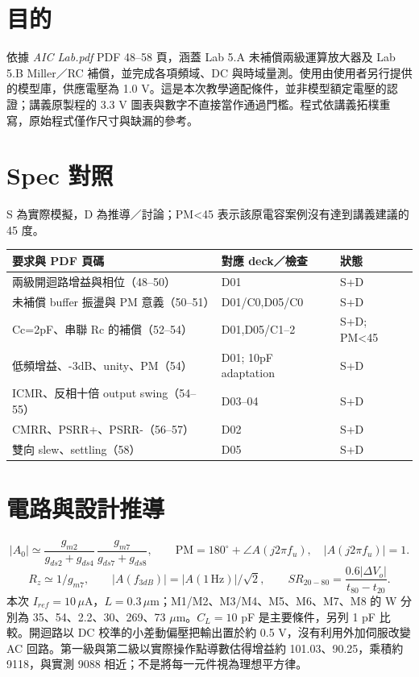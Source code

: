 \section{目的}
依據 \textit{AIC Lab.pdf} PDF 48--58 頁，涵蓋 Lab 5.A 未補償兩級運算放大器及 Lab 5.B Miller／RC 補償，並完成各項頻域、DC 與時域量測。使用由使用者另行提供的模型庫，供應電壓為 1.0 V。這是本次教學適配條件，並非模型額定電壓的認證；講義原製程的 3.3 V 圖表與數字不直接當作通過門檻。程式依講義拓樸重寫，原始程式僅作尺寸與缺漏的參考。

\section{Spec 對照}
S 為實際模擬，D 為推導／討論；PM<45 表示該原電容案例沒有達到講義建議的 45 度。
\small\begin{longtable}{p{.46\linewidth}p{.30\linewidth}p{.15\linewidth}}\toprule
要求與 PDF 頁碼 & 對應 deck／檢查 & 狀態 \\ \midrule\endhead
兩級開迴路增益與相位（48--50） & D01 & S+D \\
未補償 buffer 振盪與 PM 意義（50--51） & D01/C0,D05/C0 & S+D \\
Cc=2pF、串聯 Rc 的補償（52--54） & D01,D05/C1--2 & S+D; PM<45 \\
低頻增益、-3dB、unity、PM（54） & D01; 10pF adaptation & S+D \\
ICMR、反相十倍 output swing（54--55） & D03--04 & S+D \\
CMRR、PSRR+、PSRR-（56--57） & D02 & S+D \\
雙向 slew、settling（58） & D05 & S+D \\
\bottomrule\end{longtable}\normalsize


\section{電路與設計推導}
\[
 |A_0|\simeq\frac{g_{m2}}{g_{ds2}+g_{ds4}}\,
 \frac{g_{m7}}{g_{ds7}+g_{ds8}},\qquad
 \mathrm{PM}=180^\circ+\angle A(j2\pi f_u),\quad |A(j2\pi f_u)|=1.
 \]
 \[
 R_z\simeq1/g_{m7},\qquad
 |A(f_{3dB})|=|A(1\,\mathrm{Hz})|/\sqrt2,\qquad
 SR_{20-80}=\frac{0.6|\Delta V_o|}{t_{80}-t_{20}}.
 \]本次 $I_{ref}=10\,\mu$A，$L=0.3\,\mu$m；M1/M2、M3/M4、M5、M6、M7、M8 的 W 分別為 35、54、2.2、30、269、73 $\mu$m。$C_L=10$ pF 是主要條件，另列 1 pF 比較。開迴路以 DC 校準的小差動偏壓把輸出置於約 0.5 V，沒有利用外加伺服改變 AC 回路。第一級與第二級以實際操作點導數估得增益約 101.03、90.25，乘積約 9118，與實測 9088 相近；不是將每一元件視為理想平方律。

